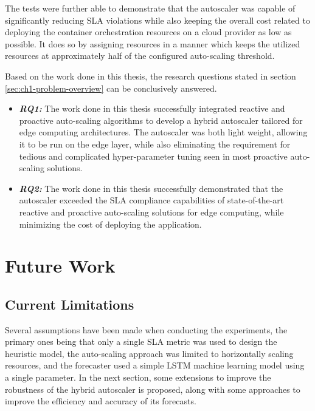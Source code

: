 The tests were further able to demonstrate that the autoscaler was capable of significantly reducing SLA violations while also keeping the overall cost related to deploying the container orchestration resources on a cloud provider as low as possible. It does so by assigning resources in a manner which keeps the utilized resources at approximately half of the configured auto-scaling threshold.\par

Based on the work done in this thesis, the research questions stated in section \ref{sec:ch1-problem-overview} can be conclusively answered.

\begin{itemize}
    \item \textbf{\textit{RQ1:}} The work done in this thesis successfully integrated reactive and proactive auto-scaling algorithms to develop a hybrid autoscaler tailored for edge computing architectures. The autoscaler was both light weight, allowing it to be run on the edge layer, while also eliminating the requirement for tedious and complicated hyper-parameter tuning seen in most proactive auto-scaling solutions.
    \item \textbf{\textit{RQ2:}} The work done in this thesis successfully demonstrated that the autoscaler exceeded the SLA compliance capabilities of state-of-the-art reactive and proactive auto-scaling solutions for edge computing, while minimizing the cost of deploying the application.
\end{itemize}

\section{Future Work}
\label{sec:ch7-future-work}

\subsection{Current Limitations}
\label{subsec:ch7-limitations}

Several assumptions have been made when conducting the experiments, the primary ones being that only a single SLA metric was used to design the heuristic model, the auto-scaling approach was limited to horizontally scaling resources, and the forecaster used a simple LSTM machine learning model using a single parameter. In the next section, some extensions to improve the robustness of the hybrid autoscaler is proposed, along with some approaches to improve the efficiency and accuracy of its forecasts.\par

